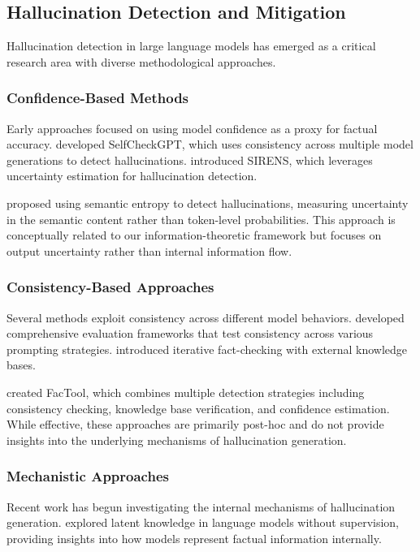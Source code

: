 \subsection{Hallucination Detection and Mitigation}
\label{subsec:hallucination_detection}

Hallucination detection in large language models has emerged as a critical research area with diverse methodological approaches.

\subsubsection{Confidence-Based Methods}
Early approaches focused on using model confidence as a proxy for factual accuracy. \citet{manakul2023selfcheckgpt} developed SelfCheckGPT, which uses consistency across multiple model generations to detect hallucinations. \citet{zhang2023sirens} introduced SIRENS, which leverages uncertainty estimation for hallucination detection.

\citet{farquhar2024detecting} proposed using semantic entropy to detect hallucinations, measuring uncertainty in the semantic content rather than token-level probabilities. This approach is conceptually related to our information-theoretic framework but focuses on output uncertainty rather than internal information flow.

\subsubsection{Consistency-Based Approaches}
Several methods exploit consistency across different model behaviors. \citet{li2023halueval} developed comprehensive evaluation frameworks that test consistency across various prompting strategies. \citet{peng2023check} introduced iterative fact-checking with external knowledge bases.

\citet{chern2023factool} created FacTool, which combines multiple detection strategies including consistency checking, knowledge base verification, and confidence estimation. While effective, these approaches are primarily post-hoc and do not provide insights into the underlying mechanisms of hallucination generation.

\subsubsection{Mechanistic Approaches}
Recent work has begun investigating the internal mechanisms of hallucination generation. \citet{burns2023discovering} explored latent knowledge in language models without supervision, providing insights into how models represent factual information internally.

